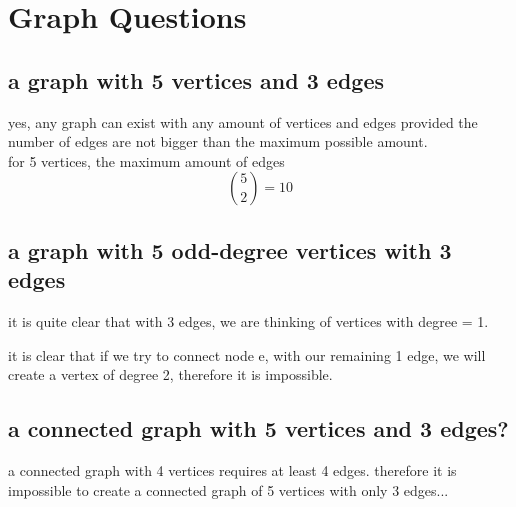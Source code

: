 \documentclass[a4paper,12pt]{article}
\begin{document}
\section{Graph Questions}

\subsection{a graph with 5 vertices and 3 edges}
yes, any graph can exist with any amount of vertices and edges provided the number of edges are not bigger than the maximum possible amount.\\
for 5 vertices, the maximum amount of edges 
  \[\binom{5}{2} = 10\]
\begin{center}
\end{center}
    
\subsection{a graph with 5 odd-degree vertices with 3 edges}
  it is quite clear that with 3 edges, we are thinking of vertices with
  degree = 1.\\
\begin{center}
\end{center}
it is clear that if we try to connect node e, with our remaining 1 edge,
we will create a vertex of degree 2, therefore it is impossible.
\subsection{a connected graph with 5 vertices and 3 edges?}
a connected graph with 4 vertices requires at least 4 edges.
therefore it is impossible to create a connected graph of 5 vertices with only 3 edges...
\begin{center}
\end{center}
\end{document}
